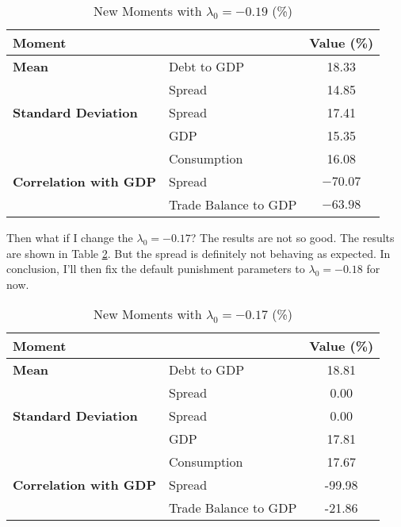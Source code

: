 \documentclass{article}
\begin{document}
\begin{table}[h]
    \centering
    \begin{tabular}{llc}
        \toprule
        \textbf{Moment}               &                      & \textbf{Value (\%)} \\
        \midrule
        \textbf{Mean}                 & Debt to GDP          & 18.33               \\
                                      & Spread               & 14.85               \\
        \addlinespace
        \textbf{Standard Deviation}   & Spread               & 17.41               \\
                                      & GDP                  & 15.35               \\
                                      & Consumption          & 16.08               \\
        \addlinespace
        \textbf{Correlation with GDP} & Spread               & $-70.07$            \\
                                      & Trade Balance to GDP & $-63.98$            \\
        \bottomrule
    \end{tabular}
    \caption{New Moments with $\lambda_0 = -0.19$ (\%)} \label{tab:new_moments_5}
\end{table}

Then what if I change the $\lambda_0=-0.17$? The results are not so good. The
results are shown in Table \ref{tab:new_moments_6}. But the spread is
definitely not behaving as expected. In conclusion, I'll then fix the default
punishment parameters to $\lambda_0 = -0.18$ for now.
\begin{table}[h]
    \centering
    \begin{tabular}{llc}
        \toprule
        \textbf{Moment}               &                      & \textbf{Value (\%)} \\
        \midrule
        \textbf{Mean}                 & Debt to GDP          & 18.81               \\
                                      & Spread               & 0.00                \\
        \addlinespace
        \textbf{Standard Deviation}   & Spread               & 0.00                \\
                                      & GDP                  & 17.81               \\
                                      & Consumption          & 17.67               \\
        \addlinespace
        \textbf{Correlation with GDP} & Spread               & -99.98              \\
                                      & Trade Balance to GDP & -21.86              \\
        \bottomrule
    \end{tabular}
    \caption{New Moments with $\lambda_0 = -0.17$ (\%)} \label{tab:new_moments_6}
\end{table}
\end{document}
